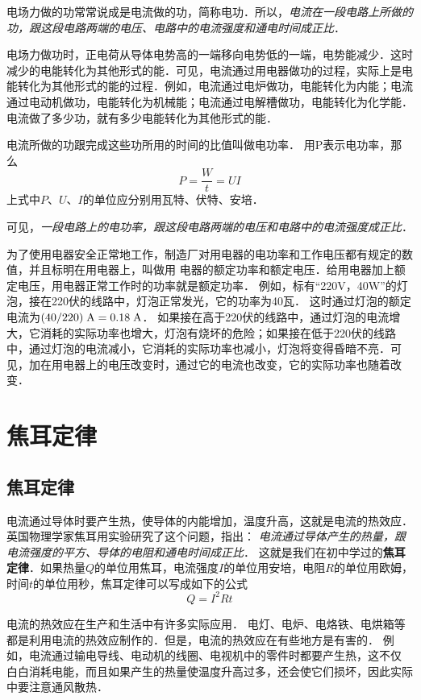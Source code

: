电场力做的功常常说成是电流做的功，简称电功．所以，\textit{电流在一段电路上所做的功，跟这段电路两端的电压、电路中的电流强度和通电时间成正比}．

电场力做功时，正电荷从导体电势高的一端移向电势低的一端，电势能减少．这时减少的电能转化为其他形式的能．可见，电流通过用电器做功的过程，实际上是电能转化为其他形式的能的过程．例如，电流通过电炉做功，电能转化为内能；电流通过电动机做功，电能转化为机械能；电流通过电解槽做功，电能转化为化学能．电流做了多少功，就有多少电能转化为其他形式的能．

电流所做的功跟完成这些功所用的时间的比值叫做电功率．
用P表示电功率，那么
\[P=\frac{W}{t}=UI\]
上式中$P$、$U$、$I$的单位应分别用瓦特、伏特、安培．

可见，\textit{一段电路上的电功率，跟这段电路两端的电压和电路中的电流强度成正比}．

为了使用电器安全正常地工作，制造厂对用电器的电功率和工作电压都有规定的数值，并且标明在用电器上，叫做用
电器的额定功率和额定电压．给用电器加上额定电压，用电器正常工作时的功率就是额定功率．
例如，标有“220V，40W”的灯泡，接在220伏的线路中，灯泡正常发光，它的功率为40瓦．
这时通过灯泡的额定电流为$(40/220) \;\text{A} =0.18 \;\text{A} $．
如果接在高于220伏的线路中，通过灯泡的电流增大，它消耗的实际功率也增大，灯泡有烧坏的危险；如果接在低于220伏的线路中，通过灯泡的电流减小，它消耗的实际功率也减小，灯泡将变得昏暗不亮．可见，加在用电器上的电压改变时，通过它的电流也改变，它的实际功率也随着改变．

\section{焦耳定律}
\subsection{焦耳定律}


电流通过导体时要产生热，使导体的内能增加，温度升高，这就是电流的热效应．
英国物理学家焦耳用实验研究了这个问题，指出：
\textit{电流通过导体产生的热量，跟电流强度的平方、导体的电阻和通电时间成正比}．
这就是我们在初中学过的\textbf{焦耳定律}．如果热量$Q$的单位用焦耳，电流强度$I$的单位用安培，电阻$R$的单位用欧姆，时间$t$的单位用秒，焦耳定律可以写成如下的公式
\[Q=I^2Rt\]

电流的热效应在生产和生活中有许多实际应用．
电灯、电炉、电烙铁、电烘箱等都是利用电流的热效应制作的．但是，电流的热效应在有些地方是有害的．
例如，电流通过输电导线、电动机的线圈、电视机中的零件时都要产生热，这不仅
白白消耗电能，而且如果产生的热量使温度升高过多，还会使它们损坏，因此实际中要注意通风散热．

